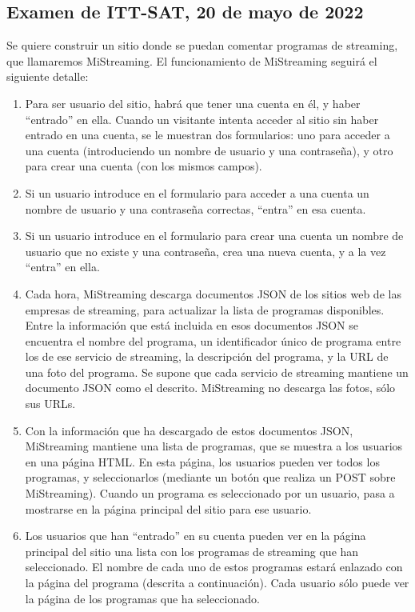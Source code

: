 \subsection{Examen de ITT-SAT, 20 de mayo de 2022}

Se quiere construir un sitio donde se puedan comentar programas de streaming, que llamaremos MiStreaming. El funcionamiento de MiStreaming seguirá el siguiente detalle:

\begin{enumerate}
\item Para ser usuario del sitio, habrá que tener una cuenta en él, y haber ``entrado'' en ella. Cuando un visitante intenta acceder al sitio sin haber entrado en una cuenta, se le muestran dos formularios: uno para acceder a una cuenta (introduciendo un nombre de usuario y una contraseña), y otro para crear una cuenta (con los mismos campos).
\item Si un usuario introduce en el formulario para acceder a una cuenta un nombre de usuario y una contraseña correctas, ``entra'' en esa cuenta.
\item Si un usuario introduce en el formulario para crear una cuenta un nombre de usuario que no existe y una contraseña, crea una nueva cuenta, y a la vez ``entra'' en ella.
\item Cada hora, MiStreaming descarga documentos JSON de los sitios web de las empresas de streaming, para actualizar la lista de programas disponibles. Entre la información que está incluida en esos documentos JSON se encuentra el nombre del programa, un identificador único de programa entre los de ese servicio de streaming, la descripción del programa, y la URL de una foto del programa. Se supone que cada servicio de streaming mantiene un documento JSON como el descrito. MiStreaming no descarga las fotos, sólo sus URLs.
\item Con la información que ha descargado de estos documentos JSON, MiStreaming mantiene una lista de programas, que se muestra a los usuarios en una página HTML. En esta página, los usuarios pueden ver todos los programas, y seleccionarlos (mediante un botón que realiza un POST sobre MiStreaming). Cuando un programa es seleccionado por un usuario, pasa a mostrarse en la página principal del sitio para ese usuario.
\item Los usuarios que han ``entrado'' en su cuenta pueden ver en la página principal del sitio una lista con los programas de streaming que han seleccionado. El nombre de cada uno de estos programas estará enlazado con la página del programa (descrita a continuación). Cada usuario sólo puede ver la página de los programas que ha seleccionado.

\end{enumerate}
